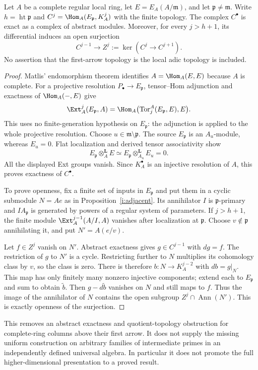 \begin{proposition}
Let $A$ be a complete regular local ring, let
$E=E_A(A/\mathfrak m)$, and let $\mathfrak p\ne\mathfrak m$.
Write $h=\operatorname{ht}\mathfrak p$ and
$C^j=\Hom_A(E_{\mathfrak p},K_A^j)$ with the finite topology.
The complex $C^\bullet$ is exact as a complex of abstract modules.
Moreover, for every $j>h+1$, its differential induces an open
surjection
\[
 C^{j-1}\longrightarrow Z^j:=\ker(C^j\to C^{j+1}).
\]
No assertion that the first-arrow topology is the local adic
topology is included.
\end{proposition}
\begin{proof}
Matlis' endomorphism theorem identifies
$A=\Hom_A(E,E)$ because $A$ is complete. For a projective
resolution $P_\bullet\to E_{\mathfrak p}$, tensor--Hom adjunction
and exactness of $\Hom_A(-,E)$ give
\[
 \Ext_A^j(E_{\mathfrak p},A)
   =\Hom_A\bigl(\operatorname{Tor}_j^A(E_{\mathfrak p},E),E\bigr).
\]
This uses no finite-generation hypothesis on $E_{\mathfrak p}$:
the adjunction is applied to the whole projective resolution.
Choose $u\in\mathfrak m\setminus\mathfrak p$. The source
$E_{\mathfrak p}$ is an $A_u$-module, whereas $E_u=0$.
Flat localization and derived tensor associativity show
\[
 E_{\mathfrak p}\mathbin{\otimes}_A^{\mathbf L}E
  \simeq
 E_{\mathfrak p}\mathbin{\otimes}_{A_u}^{\mathbf L}E_u=0.
\]
All the displayed Ext groups vanish. Since $K_A^\bullet$ is an
injective resolution of $A$, this proves exactness of $C^\bullet$.

To prove openness, fix a finite set of inputs in $E_{\mathfrak p}$
and put them in a cyclic submodule $N=Ae$ as in
Proposition~\ref{i:adjacent}. Its annihilator $I$ is
$\mathfrak p$-primary and $I A_{\mathfrak p}$ is generated by
powers of a regular system of parameters. If $j>h+1$, the finite
module $\Ext_A^{j-1}(A/I,A)$ vanishes after localization at
$\mathfrak p$. Choose $v\notin\mathfrak p$ annihilating it, and
put $N'=A(e/v)$.

Let $f\in Z^j$ vanish on $N'$. Abstract exactness gives
$g\in C^{j-1}$ with $dg=f$. The restriction of $g$ to $N'$
is a cycle. Restricting further to $N$ multiplies its cohomology
class by $v$, so the class is zero. There is therefore
$b:N\to K_A^{j-2}$ with $db=g|_N$. This map has only finitely
many nonzero injective components; extend each to
$E_{\mathfrak p}$ and sum to obtain $\widetilde b$.
Then $g-d\widetilde b$ vanishes on $N$ and still maps to $f$.
Thus the image of the annihilator of $N$ contains the open
subgroup $Z^j\cap\operatorname{Ann}(N')$. This is exactly
openness of the surjection.
\end{proof}

This removes an abstract exactness and quotient-topology obstruction
for complete-ring columns above their first arrow. It does not
supply the missing uniform construction on arbitrary families of
intermediate primes in an independently defined universal algebra.
In particular it does not promote the full higher-dimensional
presentation to a proved result.
